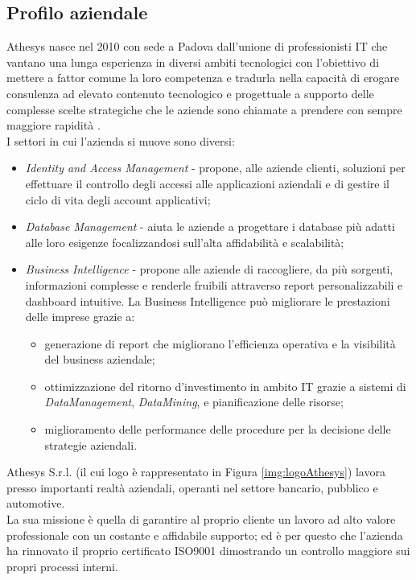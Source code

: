 \subsection{Profilo aziendale}
Athesys nasce nel 2010 con sede a Padova dall'unione di professionisti IT che vantano una lunga esperienza in diversi ambiti tecnologici con l’obiettivo di mettere a fattor comune la loro competenza e tradurla nella capacità di erogare consulenza ad elevato contenuto tecnologico e progettuale a supporto delle complesse scelte strategiche che le aziende sono chiamate a prendere con sempre maggiore rapidità \cite{athesys}.\\
I settori in cui l'azienda si muove sono diversi:
\begin{itemize}
	\item \textit{Identity and Access Management} - propone, alle aziende clienti, soluzioni per effettuare il controllo degli accessi alle applicazioni aziendali e di gestire il ciclo di vita degli account applicativi;
	\item \textit{Database Management} - aiuta le aziende a progettare i database più adatti alle loro esigenze focalizzandosi sull'alta affidabilità e scalabilità;
	\item \textit{Business Intelligence} - propone alle aziende di raccogliere, da più sorgenti, informazioni complesse e renderle fruibili attraverso report personalizzabili e dashboard intuitive. La Business Intelligence può migliorare le prestazioni delle imprese grazie a:
	\begin{itemize}
		\item generazione di report che migliorano l'efficienza operativa e la visibilità del business aziendale;
		\item ottimizzazione del ritorno d'investimento in ambito IT grazie a sistemi di \emph{\gls{DataManagement}}\glsfirstoccur, \emph{\gls{DataMining}}\glsfirstoccur, e pianificazione delle risorse;
		\item miglioramento delle performance delle procedure per la decisione delle strategie aziendali.
	\end{itemize} 
\end{itemize}
Athesys S.r.l. (il cui logo è rappresentato in Figura \ref{img:logoAthesys}) lavora presso importanti realtà aziendali, operanti nel settore bancario, pubblico e automotive.\\
La sua missione è quella di garantire al proprio cliente un lavoro ad alto valore professionale con un costante e affidabile supporto; ed è per questo che l'azienda ha rinnovato il proprio certificato ISO9001 dimostrando un controllo maggiore sui propri processi interni.\\

